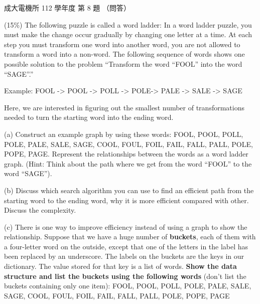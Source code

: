 \begin{pastexam}[label={px:ncku-112-ee-ds-08}]{成大電機所 112 學年度 第 8 題}
（問答）

(15\%) The following puzzle is called a word ladder: In a word ladder puzzle, you must make the
change occur gradually by changing one letter at a time. At each step you must transform one word
into another word, you are not allowed to transform a word into a non-word. The following sequence
of words shows one possible solution to the problem ``Transform the word ``FOOL'' into the word
``SAGE''.''

\hspace*{1em}Example: FOOL -> POOL -> POLL -> POLE-> PALE -> SALE -> SAGE

Here, we are interested in figuring out the smallest number of transformations needed to turn the
starting word into the ending word.

(a) Construct an example graph by using these words: FOOL, POOL, POLL, POLE, PALE, SALE, SAGE, COOL,
FOUL, FOIL, FAIL, FALL, PALL, POLE, POPE, PAGE. Represent the relationships between the words as a
word ladder graph. (Hint: Think about the path where we get from the word ``FOOL'' to the word
``SAGE'').

(b) Discuss which search algorithm you can use to find an efficient path from the starting word to
the ending word, why it is more efficient compared with other. Discuss the complexity.

(c) There is one way to improve efficiency instead of using a graph to show the relationship.
Suppose that we have a huge number of \textbf{buckets}, each of them with a four-letter word on the
outside, except that one of the letters in the label has been replaced by an underscore. The labels
on the buckets are the keys in our dictionary. The value stored for that key is a list of words.
\textbf{Show the data structure and list the buckets using the following words} (don't list the
buckets containing only one item): FOOL, POOL, POLL, POLE, PALE, SALE, SAGE, COOL, FOUL, FOIL, FAIL,
FALL, PALL, POLE, POPE, PAGE
\end{pastexam}

